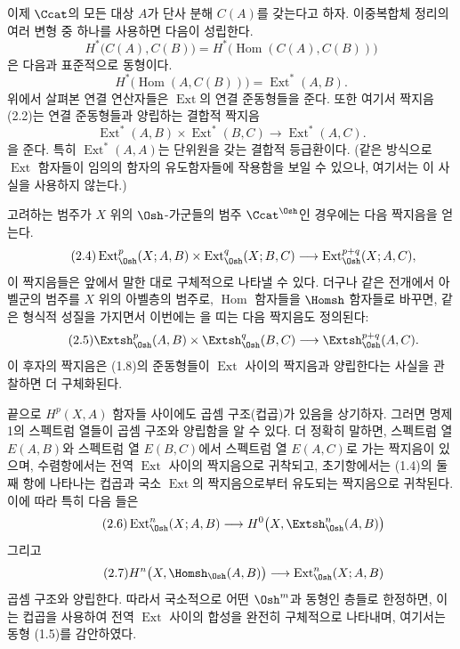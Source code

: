 이제 $\Ccat$의 모든 대상 $A$가 단사 분해 $C(A)$를 갖는다고 하자.
이중복합체 정리의 여러 변형 중 하나를 사용하면 다음이 성립한다.
\[
  H^{*}\bigl(C(A),C(B)\bigr)
  =H^{*}\bigl(\operatorname{Hom}(C(A),C(B))\bigr)
\]
은 다음과 표준적으로 동형이다.
\[
  H^{*}\bigl(\operatorname{Hom}(A,C(B))\bigr)
  =\operatorname{Ext}^{*}(A,B).
\]
위에서 살펴본 연결 연산자들은 $\operatorname{Ext}$의 연결 준동형들을
준다. 또한 여기서 짝지음 (2.2)는 연결 준동형들과 양립하는 결합적
짝지음
\begin{equation}\tag{2.3}
  \operatorname{Ext}^{*}(A,B)\times\operatorname{Ext}^{*}(B,C)
  \longrightarrow\operatorname{Ext}^{*}(A,C).
\end{equation}
을 준다. 특히 $\operatorname{Ext}^{*}(A,A)$는 단위원을 갖는 결합적
등급환이다. (같은 방식으로 $\operatorname{Ext}$ 함자들이 임의의 함자의
유도함자들에 작용함을 보일 수 있으나, 여기서는 이 사실을 사용하지 않는다.)

고려하는 범주가 $X$ 위의
$\Osh$-가군들의 범주 $\Ccat^{\Osh}$인 경우에는 다음 짝지음을 얻는다.
\begin{equation}\tag{2.4}
  \operatorname{Ext}_{\Osh}^{p}(X;A,B)
  \times\operatorname{Ext}_{\Osh}^{q}(X;B,C)
  \longrightarrow\operatorname{Ext}_{\Osh}^{p+q}(X;A,C),
\end{equation}
이 짝지음들은 앞에서 말한 대로 구체적으로 나타낼 수 있다. 더구나 같은
전개에서 아벨군의 범주를 $X$ 위의 아벨층의
범주로, $\operatorname{Hom}$ 함자들을
$\Homsh$ 함자들로 바꾸면, 같은 형식적 성질을 가지면서
이번에는 을 띠는 다음 짝지음도 정의된다:
\begin{equation}\tag{2.5}
  \Extsh_{\Osh}^{p}(A,B)\times\Extsh_{\Osh}^{q}(B,C)
  \longrightarrow\Extsh_{\Osh}^{p+q}(A,C).
\end{equation}
이 후자의 짝지음은 (1.8)의 준동형들이
$\operatorname{Ext}$ 사이의 짝지음과 양립한다는 사실을 관찰하면 더 구체화된다.

끝으로 $H^{p}(X,A)$ 함자들 사이에도 곱셈
구조(컵곱)가 있음을 상기하자. 그러면 명제 1의 스펙트럼 열들이
곱셈 구조와 양립함을 알 수 있다. 더
정확히 말하면, 스펙트럼 열 $E(A,B)$와 스펙트럼 열
$E(B,C)$에서 스펙트럼 열 $E(A,C)$로 가는 짝지음이 있으며, 수렴항에서는
전역 $\operatorname{Ext}$ 사이의 짝지음으로 귀착되고,
초기항에서는 (1.4)의 둘째 항에 나타나는
컵곱과 국소 $\operatorname{Ext}$의 짝지음으로부터 유도되는 짝지음으로 귀착된다. 이에 따라
특히 다음 들은
\begin{equation}\tag{2.6}
  \operatorname{Ext}_{\Osh}^{n}(X;A,B)
  \longrightarrow H^{0}\bigl(X,\Extsh_{\Osh}^{n}(A,B)\bigr)
\end{equation}
그리고
\begin{equation}\tag{2.7}
  H^{n}\bigl(X,\Homsh_{\Osh}(A,B)\bigr)
  \longrightarrow\operatorname{Ext}_{\Osh}^{n}(X;A,B)
\end{equation}
곱셈 구조와 양립한다. 따라서
국소적으로 어떤 $\Osh^{m}$과 동형인 층들로 한정하면, 이는
컵곱을 사용하여 전역 $\operatorname{Ext}$ 사이의 합성을 완전히 구체적으로 나타내며,
여기서는 동형 (1.5)를 감안하였다.

